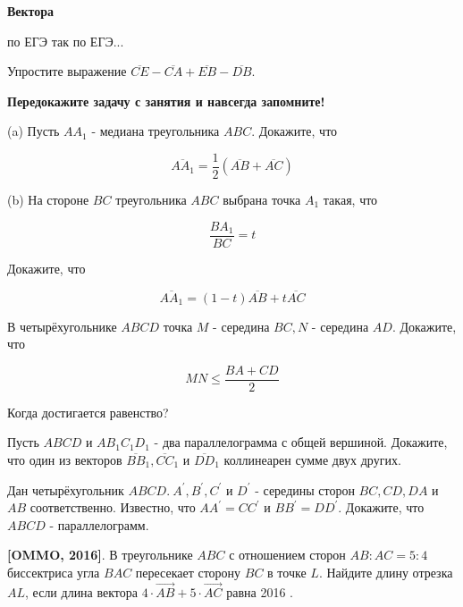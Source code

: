 \centerline{\bf \Huge Вектора}

\begin{flushright}
        \scriptsize{по ЕГЭ так по ЕГЭ...}
\end{flushright}

Упростите выражение $\overline{C E}-\overline{C A}+\overline{E B}-\overline{D B}$.

 \textbf{Передокажите задачу с занятия и навсегда запомните!}

(a) Пусть $A A_1$ - медиана треугольника $A B C$. Докажите, что

$$
\overline{A A_1}=\frac{1}{2}(\overline{A B}+\overline{A C})
$$

(b) На стороне $B C$ треугольника $A B C$ выбрана точка $A_1$ такая, что

$$
\frac{B A_1}{B C}=t
$$


Докажите, что

$$
\overline{A A_1}=(1-t) \overline{A B}+t \overline{A C}
$$

В четырёхугольнике $A B C D$ точка $M$ - середина $B C, N$ - середина $A D$. Докажите, что

$$
M N \leqslant \frac{B A+C D}{2}
$$


Когда достигается равенство?

Пусть $A B C D$ и $A B_1 C_1 D_1$ - два параллелограмма с общей вершиной. Докажите, что один из векторов $\overline{B B}_1, \overline{C C}_1$ и $\overline{D D}_1$ коллинеарен сумме двух других.

Дан четырёхугольник $A B C D.\  A^{\prime}, B^{\prime}, C^{\prime}$ и $D^{\prime}$ - середины сторон $B C, C D, D A$ и $A B$ соответственно. Известно, что $A A^{\prime}=C C^{\prime}$ и $B B^{\prime}=D D^{\prime}$. Докажите, что $A B C D$ - параллелограмм.

\textbf{[OMMO, 2016]}. В треугольнике $A B C$ с отношением сторон $A B: A C=5: 4$ биссектриса угла $B A C$ пересекает сторону $B C$ в точке $L$. Найдите длину отрезка $A L$, если длина вектора $4 \cdot \overrightarrow{A B}+5 \cdot \overrightarrow{A C}$ равна 2016 .